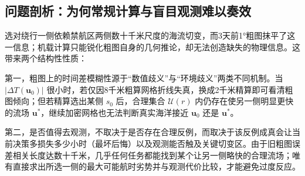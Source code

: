 \subsection{问题剖析：为何常规计算与盲目观测难以奏效}
选对绕行一侧依赖禁航区两侧数十千米尺度的海流切变，而3天前1°粗图抹平了这一信息；机载计算只能锐化粗图自身的几何推论，却无法创造缺失的物理信息。这带来两个结构性性质：

第一，粗图上的时间差模糊性源于“数值歧义”与“环境歧义”两类不同机制。当 $|\Delta T(\boldsymbol{u}_0)|$ 很小时，若仅因8千米粗算网格折线失真，换成2千米精算即可看清粗图倾向；但若精算选出某侧 $s_0$ 后，合理集合 $\mathcal{U}(r)$ 内仍存在使另一侧明显更快的流场 $\boldsymbol{u}^*$，继续加密网格也无法判断真实海洋接近 $\boldsymbol{u}_0$ 还是 $\boldsymbol{u}^*$。

第二，是否值得去观测，不取决于是否存在合理反例，而取决于该反例成真会让当前决策多损失多少小时（最坏后悔）以及观测能否触及关键切变区。由于旧粗图误差相关长度达数十千米，几乎任何任务都能找到某个让另一侧略快的合理流场；唯有直接求出所选一侧的最大可能航时劣势并与观测代价比较，才能避免过度反应。
